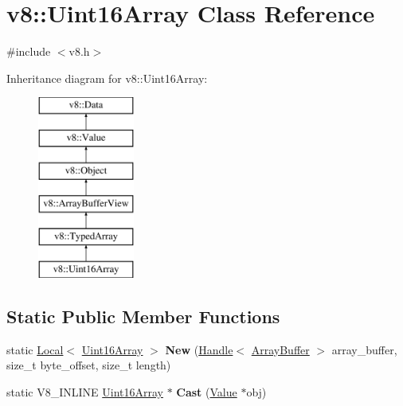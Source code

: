 \hypertarget{classv8_1_1_uint16_array}{}\section{v8\+:\+:Uint16\+Array Class Reference}
\label{classv8_1_1_uint16_array}


{\ttfamily \#include $<$v8.\+h$>$}

Inheritance diagram for v8\+:\+:Uint16\+Array\+:\begin{figure}[H]
\begin{center}
\leavevmode
\includegraphics[height=6.000000cm]{classv8_1_1_uint16_array}
\end{center}
\end{figure}
\subsection*{Static Public Member Functions}
\begin{DoxyCompactItemize}
\item 
\hypertarget{classv8_1_1_uint16_array_a61009e1e8ee6903da33cb95685910270}{}static \hyperlink{classv8_1_1_local}{Local}$<$ \hyperlink{classv8_1_1_uint16_array}{Uint16\+Array} $>$ {\bfseries New} (\hyperlink{classv8_1_1_handle}{Handle}$<$ \hyperlink{classv8_1_1_array_buffer}{Array\+Buffer} $>$ array\+\_\+buffer, size\+\_\+t byte\+\_\+offset, size\+\_\+t length)\label{classv8_1_1_uint16_array_a61009e1e8ee6903da33cb95685910270}

\item 
\hypertarget{classv8_1_1_uint16_array_a84b017960621903a00ef2d912233ce34}{}static V8\+\_\+\+I\+N\+L\+I\+N\+E \hyperlink{classv8_1_1_uint16_array}{Uint16\+Array} $\ast$ {\bfseries Cast} (\hyperlink{classv8_1_1_value}{Value} $\ast$obj)\label{classv8_1_1_uint16_array_a84b017960621903a00ef2d912233ce34}

\end{DoxyCompactItemize}
